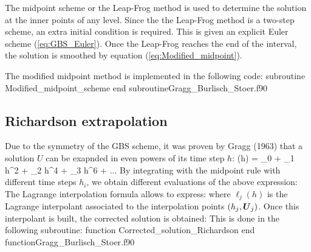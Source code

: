      
The midpoint scheme or the Leap-Frog method is used to determine the solution at the inner points of any level. 
Since the the Leap-Frog method is a two-step scheme, an extra initial condition is required. This is given an 
explicit Euler scheme (\ref{eq:GBS_Euler}). Once the Leap-Frog reaches the end of the interval,  the solution is smoothed by equation  
(\ref{eq:Modified_midpoint}).
      
The  modified midpoint method is implemented in the following code:      
           \vspace{0.5cm} 
     {subroutine Modified_midpoint_scheme}
     {end subroutine}{Gragg_Burlisch_Stoer.f90}
           
     
 \newpage   
 \subsection*{Richardson extrapolation}   
     	
Due to the symmetry of the GBS scheme, it was proven by Gragg (1963) that  
a solution $U$ can be exapnded in even powers of its time step $ h$: 
\Eqn
{    
(h) = _0 + _1 h^2 + _2 h^4 + _3 h^6 + ...  
}{} 
By integrating with the midpoint rule with different time steps $ h_i $, 
we obtain different evaluations of the above expression: 
The Lagrange interpolation formula allows to express: 
where $ \ell_j(h)$ is the Lagrange interpolant associated 
to the interpolation points $ (h_j, \boldsymbol{U}_j) $. 
Once this interpolant is built, the corrected solution is obtained: 
This is done in the following subroutine: 
\vspace{0.5cm}
{function Corrected_solution_Richardson}
{end function}{Gragg_Burlisch_Stoer.f90}
  
